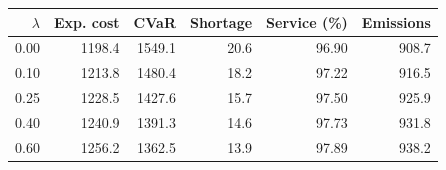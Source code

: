 \begin{tabular}{rrrrrr}
\toprule
$\lambda$ & Exp. cost & CVaR & Shortage & Service (\%) & Emissions \\
\midrule
0.00 & 1198.4 & 1549.1 & 20.6 & 96.90 & 908.7 \\
0.10 & 1213.8 & 1480.4 & 18.2 & 97.22 & 916.5 \\
0.25 & 1228.5 & 1427.6 & 15.7 & 97.50 & 925.9 \\
0.40 & 1240.9 & 1391.3 & 14.6 & 97.73 & 931.8 \\
0.60 & 1256.2 & 1362.5 & 13.9 & 97.89 & 938.2 \\
\bottomrule
\end{tabular}
